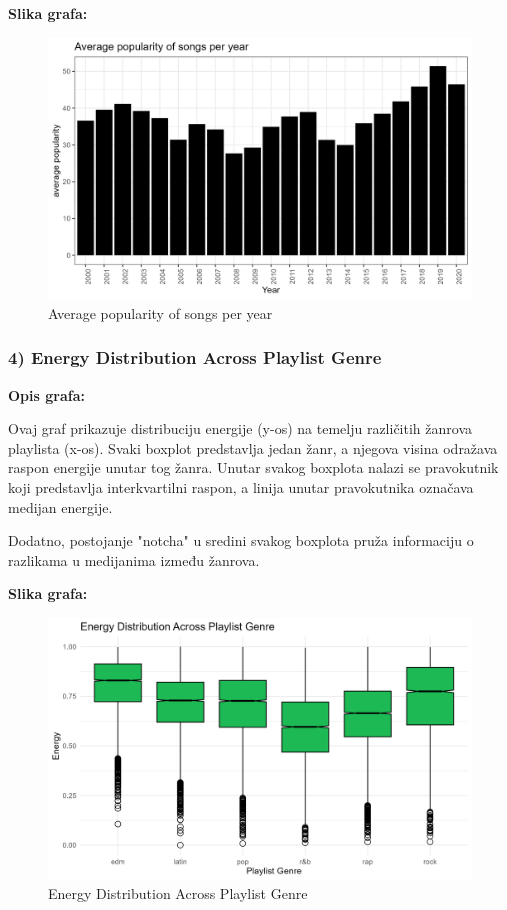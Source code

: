 	
	\textbf{Slika grafa:}
	\begin{figure}[H]
		\includegraphics[scale=0.9]{slike/Average popularity of songs per year.png}
		\centering
		\caption{Average popularity of songs per year}
		
	\end{figure}
	
		\subsubsection{4) Energy Distribution Across Playlist Genre}
	
	\textbf{Opis grafa:}
	
	Ovaj graf prikazuje distribuciju energije (y-os) na temelju različitih žanrova playlista (x-os). Svaki boxplot predstavlja jedan žanr, a njegova visina odražava raspon energije unutar tog žanra. Unutar svakog boxplota nalazi se pravokutnik koji predstavlja interkvartilni raspon, a linija unutar pravokutnika označava medijan energije.
	
	Dodatno, postojanje "notcha" u sredini svakog boxplota pruža informaciju o razlikama u medijanima između žanrova.
	
	
	\textbf{Slika grafa:}
	\begin{figure}[H]
		\includegraphics[scale=0.9]{slike/Genre-Energy.png}
		\centering
		\caption{Energy Distribution Across Playlist Genre}
		
	\end{figure}
	
